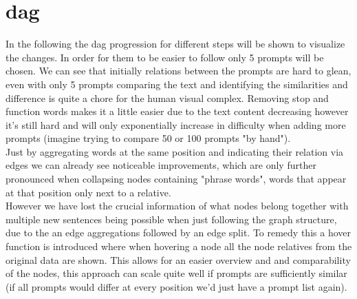 \documentclass[
  a4paper,  %
  twoside,  %
  bibliography=totoc,
  headsepline,
  cleardoublepage=empty,
  parskip=half,
  draft=false
]{scrbook}
\begin{document}
\section{dag}
In the following the dag progression for different steps will be shown to visualize the changes. In order for them to be easier to follow only 5 prompts will be chosen. We can see that initially relations between the prompts are hard to glean, even with only 5 prompts comparing the text and identifying the similarities and difference is quite a chore for the human visual complex. Removing stop and function words makes it a little easier due to the text content decreasing however it's still hard and will only exponentially increase in difficulty when adding more prompts (imagine trying to compare 50 or 100 prompts "by hand").\\
Just by aggregating words at the same position and indicating their relation via edges we can already see noticeable improvements, which are only further pronounced when collapsing nodes containing "phrase words", words that appear at that position only next to a relative.\\
However we have lost the crucial information of what nodes belong together with multiple new sentences being possible when just following the graph structure, due to the an edge aggregations followed by an edge split. To remedy this a hover function is introduced where when hovering a node all the node relatives from the original data are shown. This allows for an easier overview and and comparability of the nodes, this approach can scale quite well if prompts are sufficiently similar (if all prompts would differ at every position we'd just have a prompt list again).
\end{document}
